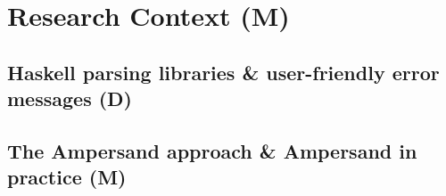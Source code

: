 

\section{Research Context (M)}
\label{sec:research-context}

\subsection{Haskell parsing libraries \& user-friendly error messages (D)}

\subsection{The Ampersand approach \& Ampersand in practice (M)}
